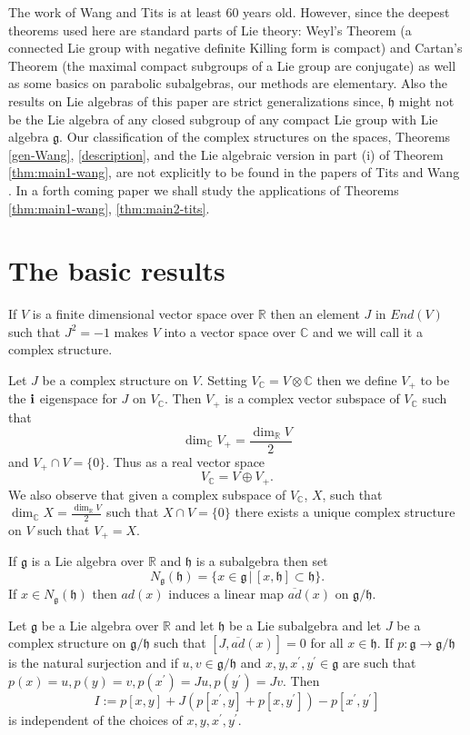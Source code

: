\documentclass{amse-new}
\numberwithin{equation}{section} %
\begin{document}
The work of Wang and Tits is at least 60 years old. However, since the deepest
theorems used here are standard parts of Lie theory: Weyl's Theorem (a
connected Lie group with negative definite Killing form is compact) and
Cartan's Theorem (the maximal compact subgroups of a Lie group are conjugate)
as well as some basics on parabolic subalgebras, our methods are elementary.
Also the results on Lie algebras of this paper are strict generalizations
since, $\mathfrak{h}$ might not be the Lie algebra of any closed subgroup of
any compact Lie group with Lie algebra $\mathfrak{g}$. Our classification of
the complex structures on the spaces, Theorems \ref{gen-Wang}, \ref{description}, and  the Lie algebraic version in part (i) of Theorem \ref{thm:main1-wang}, are not
explicitly to be found in the papers of Tits \cite{Tits} and Wang \cite{Wang}. In a forth coming paper we shall study the applications of Theorems  \ref{thm:main1-wang}, \ref{thm:main2-tits}.



\section{The basic results}

If $V$ is a finite dimensional vector space over $\mathbb{R}$ then an element
$J$ in $End(V)$ such that $J^{2}=-1$ makes $V$ into a vector space over
$\mathbb{C}$ and we will call it a complex structure.

Let $J$ be a complex structure on $V$. Setting $V_{\mathbb{C}}=V\otimes
\mathbb{C}$ then we define $V_{+}$ to be the ${\bf{i}}$ eigenspace for $J$ on
$V_{\mathbb{C}}$. Then $V_{+}$ is a complex vector subspace of $V_{\mathbb{C}%
}$ such that
\[
\dim_{\mathbb{C}}V_{+}=\frac{\dim_{\mathbb{R}}V}{2}%
\]
and $V_{+}\cap V=\{0\}$. Thus as a real vector space
\[
V_{\mathbb{C}}=V\oplus V_{+}.
\]
We also observe that given a complex subspace of $V_{\mathbb{C}}$, $X$, such
that $\dim_{\mathbb{C}}X=\frac{\dim_{\mathbb{R}}V}{2}$ such that $X\cap
V=\{0\} $ there exists a unique complex structure on $V$ such that $V_{+}=X$.

If $\mathfrak{g}$ is a Lie algebra over $\mathbb{R}$ and $\mathfrak{h}$ is a
subalgebra then set
\[
N_{\mathfrak{g}}(\mathfrak{h})=\{x\in\mathfrak{g}\, |\, [x,\mathfrak{h}%
]\subset\mathfrak{h}\}.
\]
If $x\in N_{\mathfrak{g}}(\mathfrak{h})$ then $ad(x)$ induces a linear map
$\overline{ad}(x)$ on $\mathfrak{g}/\mathfrak{h}$.

\begin{lemma}
\label{lmm:11} Let $\mathfrak{g}$ be a Lie algebra over $\mathbb{R}$ and let
$\mathfrak{h}$ be a Lie subalgebra and let $J$ be a complex structure on
$\mathfrak{g}/\mathfrak{h}$ such that $[J,\overline{ad}(x)]=0$ for all
$x\in\mathfrak{h}$. If $p:\mathfrak{g}\rightarrow\mathfrak{g}/\mathfrak{h}$ is
the natural surjection and if $u,v\in\mathfrak{g}/\mathfrak{h}$ and
$x,y,x^{\prime},y^{\prime}\in\mathfrak{g}$ are such that
$p(x)=u,p(y)=v,p(x^{\prime})=Ju,p(y^{\prime})=Jv$. Then%
\[
I:=p[x,y]+J(p[x^{\prime},y]+p[x,y^{\prime}])-p[x^{\prime},y^{\prime}]
\]
is independent of the choices of $x,y,x^{\prime},y^{\prime}$.
\end{lemma}
\end{document}
